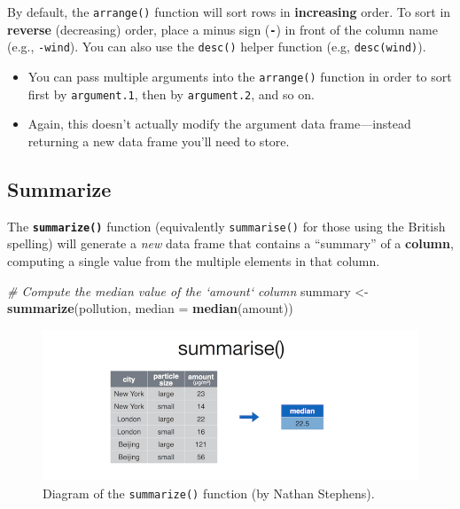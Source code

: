 \documentclass[]{book}
\newenvironment{Shaded}{\begin{snugshade}}{\end{snugshade}}
\newcommand{\KeywordTok}[1]{\textcolor[rgb]{0.13,0.29,0.53}{\textbf{#1}}}
\newcommand{\DataTypeTok}[1]{\textcolor[rgb]{0.13,0.29,0.53}{#1}}
\newcommand{\StringTok}[1]{\textcolor[rgb]{0.31,0.60,0.02}{#1}}
\newcommand{\CommentTok}[1]{\textcolor[rgb]{0.56,0.35,0.01}{\textit{#1}}}
\newcommand{\NormalTok}[1]{#1}
\theoremstyle{definition}
\theoremstyle{definition}
\theoremstyle{remark}
\begin{document}
By default, the \texttt{arrange()} function will sort rows in
\textbf{increasing} order. To sort in \textbf{reverse} (decreasing)
order, place a minus sign (\textbf{\texttt{-}}) in front of the column
name (e.g., \texttt{-wind}). You can also use the \texttt{desc()} helper
function (e.g, \texttt{desc(wind)}).

\begin{itemize}
\item
  You can pass multiple arguments into the \texttt{arrange()} function
  in order to sort first by \texttt{argument.1}, then by
  \texttt{argument.2}, and so on.
\item
  Again, this doesn't actually modify the argument data frame---instead
  returning a new data frame you'll need to store.
\end{itemize}

\subsection{Summarize}\label{summarize}

The \textbf{\texttt{summarize()}} function (equivalently
\texttt{summarise()} for those using the British spelling) will generate
a \emph{new} data frame that contains a ``summary'' of a
\textbf{column}, computing a single value from the multiple elements in
that column.

\begin{Shaded}
\begin{Highlighting}[]
\CommentTok{# Compute the median value of the `amount` column}
\NormalTok{summary <-}\StringTok{ }\KeywordTok{summarize}\NormalTok{(pollution, }\DataTypeTok{median =} \KeywordTok{median}\NormalTok{(amount))}
\end{Highlighting}
\end{Shaded}

\begin{figure}
\centering
\includegraphics{img/dplyr/summarize.png}
\caption{Diagram of the \texttt{summarize()} function (by Nathan
Stephens).}
\end{figure}
\end{document}
